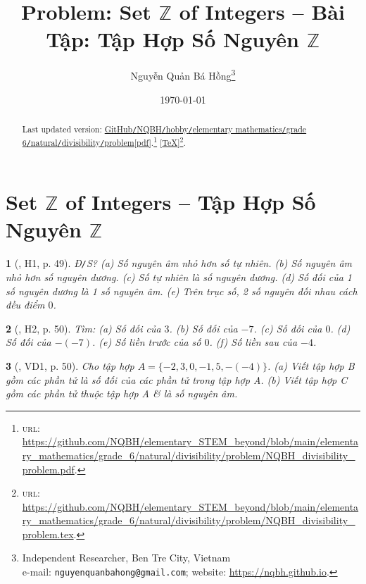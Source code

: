 \documentclass{article}
\title{Problem: Set $\mathbb{Z}$ of Integers -- Bài Tập: Tập Hợp Số Nguyên $\mathbb{Z}$}
\author{Nguyễn Quản Bá Hồng\footnote{Independent Researcher, Ben Tre City, Vietnam\\e-mail: \texttt{nguyenquanbahong@gmail.com}; website: \url{https://nqbh.github.io}.}}
\date{\today}
\newtheorem{baitoan}{}
\begin{document}
\maketitle
\begin{abstract}
	Last updated version: \href{https://github.com/NQBH/elementary_STEM_beyond/blob/main/elementary_mathematics/grade_6/natural/divisibility/problem/NQBH_divisibility_problem.pdf}{GitHub{\tt/}NQBH{\tt/}hobby{\tt/}elementary mathematics{\tt/}grade 6{\tt/}natural{\tt/}divisibility{\tt/}problem[pdf]}.\footnote{\textsc{url}: \url{https://github.com/NQBH/elementary_STEM_beyond/blob/main/elementary_mathematics/grade_6/natural/divisibility/problem/NQBH_divisibility_problem.pdf}.} [\href{https://github.com/NQBH/elementary_STEM_beyond/blob/main/elementary_mathematics/grade_6/natural/divisibility/problem/NQBH_divisibility_problem.tex}{\TeX}]\footnote{\textsc{url}: \url{https://github.com/NQBH/elementary_STEM_beyond/blob/main/elementary_mathematics/grade_6/natural/divisibility/problem/NQBH_divisibility_problem.tex}.}. 
\end{abstract}
\tableofcontents


\section{Set $\mathbb{Z}$ of Integers -- Tập Hợp Số Nguyên $\mathbb{Z}$}

\begin{baitoan}[\cite{Binh_boi_duong_Toan_6_tap_1}, H1, p. 49]
	{\rm Đ{\tt/}S?} (a) Số nguyên âm nhỏ hơn số tự nhiên. (b) Số nguyên âm nhỏ hơn số nguyên dương. (c) Số tự nhiên là số nguyên dương. (d) Số đối của 1 số nguyên dương là 1 số nguyên âm. (e) Trên trục số, 2 số nguyên đối nhau cách đều điểm $0$.
\end{baitoan}

\begin{baitoan}[\cite{Binh_boi_duong_Toan_6_tap_1}, H2, p. 50]
	Tìm: (a) Số đối của $3$. (b) Số đối của $-7$. (c) Số đối của $0$. (d) Số đối của $-(-7)$. (e) Số liền trước của số $0$. (f) Số liền sau của $-4$.
\end{baitoan}

\begin{baitoan}[\cite{Binh_boi_duong_Toan_6_tap_1}, VD1, p. 50]
	Cho tập hợp $A = \{-2,3,0,-1,5,-(-4)\}$. (a) Viết tập hợp B gồm các phần tử là số đối của các phần tử trong tập hợp A. (b) Viết tập hợp C gồm các phần tử thuộc tập hợp A \& là số nguyên âm.
\end{baitoan}
\end{document}
